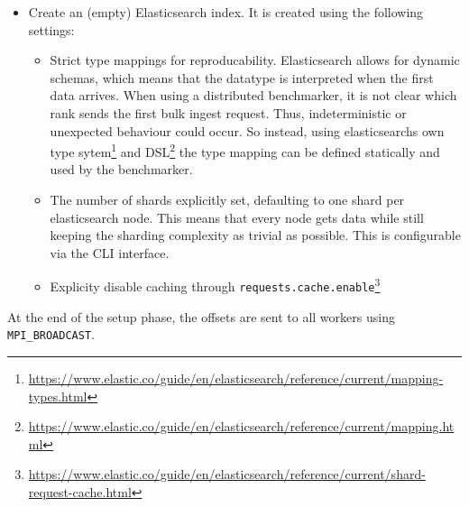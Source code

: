 \begin{itemize}
  \item Create an (empty) Elasticsearch index. It is created using the following settings:
    \begin{itemize}
      \item Strict type mappings for reproducability. Elasticsearch allows for dynamic schemas, which means that the datatype is interpreted when the first data arrives. When using a distributed benchmarker, it is not clear which rank sends the first bulk ingest request. Thus, indeterministic or unexpected behaviour could occur. So instead, using elasticsearchs own type sytem\footnote{\url{https://www.elastic.co/guide/en/elasticsearch/reference/current/mapping-types.html}} and \ac{DSL}\footnote{\url{https://www.elastic.co/guide/en/elasticsearch/reference/current/mapping.html}} the type mapping can be defined statically and used by the benchmarker.
      \item The number of shards explicitly set, defaulting to one shard per elasticsearch node. This means that every node gets data while still keeping the sharding complexity as trivial as possible. This is configurable via the \ac{CLI} interface.
      \item Explicity disable caching through \texttt{requests.cache.enable}\footnote{\url{https://www.elastic.co/guide/en/elasticsearch/reference/current/shard-request-cache.html}}
    \end{itemize}
\end{itemize}
At the end of the setup phase, the offsets are sent to all workers using \texttt{MPI\_BROADCAST}.

